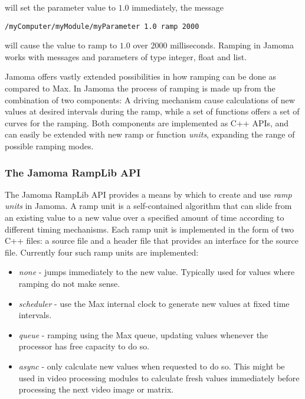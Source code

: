 \documentclass{sig-alternate}
\begin{document}
will set the parameter value to $1.0$ immediately, the message

\texttt{/myComputer/myModule/myParameter 1.0 ramp 2000}

will cause the value to ramp to $1.0$ over 2000 milliseconds. Ramping in Jamoma works with messages and parameters of type integer, float and list.

Jamoma offers vastly extended possibilities in how ramping can be done as compared to Max. In Jamoma the process of ramping is made up from the combination of two components: A driving mechanism cause calculations of new values at desired intervals during the ramp, while a set of functions offers a set of curves for the ramping. Both components are implemented as C++ APIs, and can easily be extended with new ramp or function \emph{units}, expanding the range of possible ramping modes.



\subsubsection{The Jamoma RampLib API} %
\label{ssub:the_ramp_lib}

The Jamoma RampLib API provides a means by which to create and use \emph{ramp units} in Jamoma.  A ramp unit is a self-contained algorithm that can slide from an existing value to a new value over a specified amount of time according to different timing mechanisms. Each ramp unit is implemented in the form of two C++ files: a source file and a header file that provides an interface for the source file. Currently four such ramp units are implemented:

\begin{itemize}

	\item \emph{none} - jumps immediately to the new value. Typically used for values where ramping do not make sense.

	\item \emph{scheduler} - use the Max internal clock to generate new values at fixed time intervals.

	\item \emph{queue} - ramping using the Max queue, updating values whenever the processor has free capacity to do so.

	\item \emph{async} - only calculate new values when requested to do so. This might be used in video processing modules to calculate fresh values immediately before processing the next video image or matrix.
	
\end{itemize}
\end{document}
